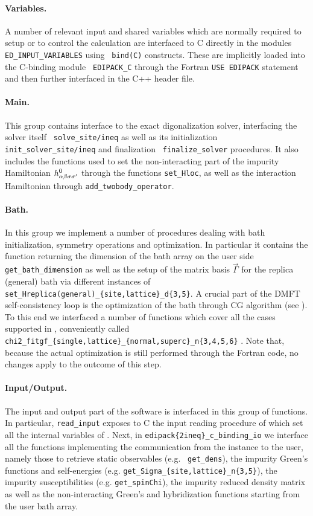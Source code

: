 \documentclass[edipack_sp.tex]{subfiles}
\begin{document}
\paragraph{{\bf Variables}.}
A number of relevant input and shared variables which are normally
required to setup or to control the calculation are interfaced to C
directly in the \NAME modules {\tt ED\_INPUT\_VARIABLES} using {\tt
  bind(C)} constructs. These are implicitly loaded into the C-binding module {\tt
  EDIPACK\_C} through the Fortran {\tt USE EDIPACK} statement and
then further interfaced in the C++ header file. 


\paragraph{{\bf Main}.} This group contains interface to the exact
digonalization solver, interfacing the solver itself {\tt
  solve\_site/ineq} as well as its initialization
{\tt init\_solver\_site/ineq} and finalization {\tt
  finalize\_solver} procedures. It also includes the functions used to
set the non-interacting part of the impurity Hamiltonian
$h^0_{\alpha\beta\sigma\sigma'}$ through the functions {\tt set\_Hloc}, as well as the
interaction Hamiltonian through {\tt add\_twobody\_operator}.


\paragraph{{\bf Bath}.} In this group we implement a number of
procedures dealing with bath initialization, symmetry operations and
optimization. In particular it contains the function returning the
dimension of the bath array on the user side {\tt
  get\_bath\_dimension} as well as the setup of the matrix basis
$\vec{\Gamma}$ for the replica (general) bath via different instances of
{\tt set\_Hreplica(general)\_\-\{site,lattice\}\_d\{3,5\}}. 
A crucial part of the DMFT self-consistency loop is the optimization of the bath through CG algorithm (see ). To this end we interfaced a
number of functions which
cover all the cases supported in \NAME, conveniently called {\tt
  chi2\_fitgf\_\{single,lattice\}\_\{normal,superc\}\_n\{3,4,5,6\}} . Note that, because the actual
optimization is still performed through the Fortran code, no changes
apply to the outcome of this step.    

\paragraph{{\bf Input/Output}.}
The input and output part of the software is interfaced in this group
of functions. In particular, {\tt read\_input} exposes to C the input
reading procedure of \NAME which set all the internal
variables of \NAME.
Next, in {\tt edipack\{2ineq\}\_c\_binding\_io} we interface all the
functions implementing the communication from the \NAME instance to
the user, namely those to retrieve static observables (e.g. {\tt
  get\_dens}), the impurity Green's functions and self-energies
(e.g. {\tt get\_Sigma\_\{site,lattice\}\_n\{3,5\}}), the
impurity susceptibilities (e.g. {\tt get\_spinChi}), the impurity reduced density matrix as well
as the non-interacting Green's and hybridization functions starting from the user bath array.   
\end{document}
